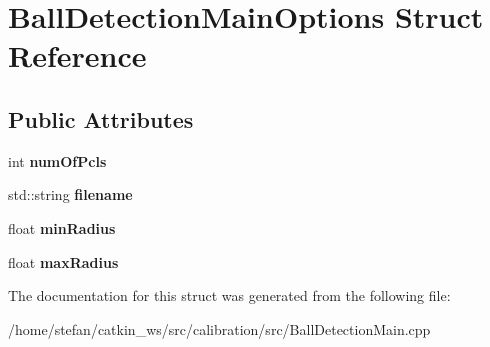 \hypertarget{structBallDetectionMainOptions}{\section{\-Ball\-Detection\-Main\-Options \-Struct \-Reference}
\label{structBallDetectionMainOptions}
}
\subsection*{\-Public \-Attributes}
\begin{DoxyCompactItemize}
\item 
\hypertarget{structBallDetectionMainOptions_a68a0d9b907c328f69907cebf16340b8a}{int {\bfseries num\-Of\-Pcls}}\label{structBallDetectionMainOptions_a68a0d9b907c328f69907cebf16340b8a}

\item 
\hypertarget{structBallDetectionMainOptions_a2b2e4033775efa12d9fe25693e10830b}{std\-::string {\bfseries filename}}\label{structBallDetectionMainOptions_a2b2e4033775efa12d9fe25693e10830b}

\item 
\hypertarget{structBallDetectionMainOptions_ac384dfef190dc6c3add85e9cd17b7d27}{float {\bfseries min\-Radius}}\label{structBallDetectionMainOptions_ac384dfef190dc6c3add85e9cd17b7d27}

\item 
\hypertarget{structBallDetectionMainOptions_ad2af1182b9c139a47ca1dcde9da0f711}{float {\bfseries max\-Radius}}\label{structBallDetectionMainOptions_ad2af1182b9c139a47ca1dcde9da0f711}

\end{DoxyCompactItemize}


\-The documentation for this struct was generated from the following file\-:\begin{DoxyCompactItemize}
\item 
/home/stefan/catkin\-\_\-ws/src/calibration/src/\-Ball\-Detection\-Main.\-cpp\end{DoxyCompactItemize}
